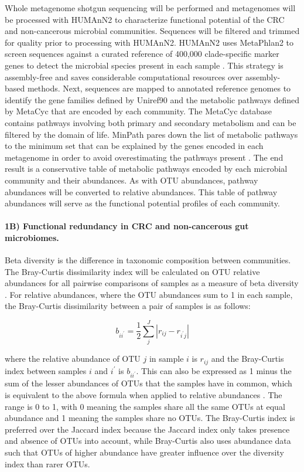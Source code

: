 \documentclass[11pt]{article}
\begin{document}
Whole metagenome shotgun sequencing will be performed and metagenomes will be processed with HUMAnN2 \cite{franzosa_species-level_2018} to characterize functional potential of the CRC and non-cancerous microbial communities.
Sequences will be filtered and trimmed for quality prior to processing with HUMAnN2.
HUMAnN2 uses MetaPhlan2 to screen sequences against a curated reference of 400,000 clade-specific marker genes to detect the microbial species present in each sample \cite{segata_metagenomic_2012}.
This strategy is assembly-free and saves considerable computational resources over assembly-based methods.
Next, sequences are mapped to annotated reference genomes to identify the gene families defined by Uniref90 and the metabolic pathways defined by MetaCyc \cite{caspi_metacyc_2018} that are encoded by each community.
The MetaCyc database contains pathways involving both primary and secondary metabolism and can be filtered by the domain of life.
MinPath pares down the list of metabolic pathways to the minimum set that can be explained by the genes encoded in each metagenome in order to avoid overestimating the pathways present \cite{ye_parsimony_2009}.
The end result is a conservative table of metabolic pathways encoded by each microbial community and their abundances.
As with OTU abundances, pathway abundances will be converted to relative abundances.
This table of pathway abundances will serve as the functional potential profiles of each community.


\paragraph{1B) Functional redundancy in CRC and non-cancerous gut microbiomes.}

Beta diversity is the difference in taxonomic composition between communities.
The Bray-Curtis dissimilarity index will be calculated on OTU relative abundances for all pairwise comparisons of samples as a measure of beta diversity \cite{bray_ordination_1957}.
For relative abundances, where the OTU abundances sum to 1 in each sample, the Bray-Curtis dissimilarity between a pair of samples is as follows:

$$b_{i i^\prime } = \frac{1}{2} \sum_{j}^J | r_{ij} - r_{i^\prime j} |$$

where the relative abundance of OTU $j$ in sample $i$ is $r_{ij}$ and the Bray-Curtis index between samples $i$ and $i^\prime$ is $b_{i i^\prime }$.
This can also be expressed as 1 minus the sum of the lesser abundances of OTUs that the samples have in common, which is equivalent to the above formula when applied to relative abundances \cite{greenacre_multivariate_2014}.
The range is 0 to 1, with 0 meaning the samples share all the same OTUs at equal abundance and 1 meaning the samples share no OTUs.
The Bray-Curtis index is preferred over the Jaccard index because the Jaccard index only takes presence and absence of OTUs into account, while Bray-Curtis also uses abundance data such that OTUs of higher abundance have greater influence over the diversity index than rarer OTUs.
\end{document}
